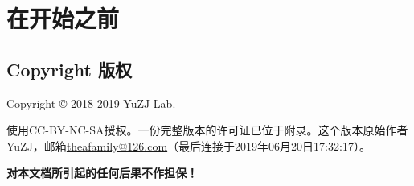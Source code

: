 \chapter{在开始之前}
\section{Copyright 版权}
Copyright \copyright{} 2018-2019 YuZJ Lab. \par
使用CC-BY-NC-SA授权。一份完整版本的许可证已位于附录。这个版本原始作者YuZJ，邮箱\url{theafamily@126.com}（最后连接于2019年06月20日17:32:17）。
\begin{center}\large \bf {\color{red}对本文档所引起的任何后果不作担保！}\normalall\end{center}
